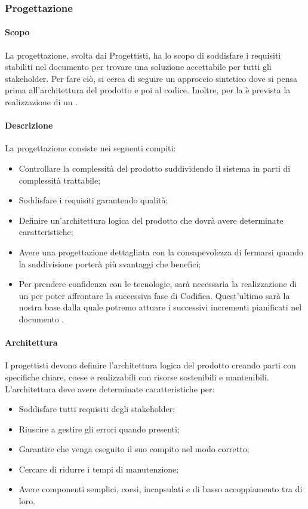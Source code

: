 \subsubsection{Progettazione}
\paragraph{Scopo}
La progettazione, svolta dai Progettisti, ha lo scopo di soddisfare i requisiti stabiliti nel documento \AdR{} per trovare una soluzione accettabile per tutti gli stakeholder.
Per fare ciò, si cerca di seguire un approccio sintetico dove si pensa prima all’architettura del prodotto e poi al codice. 
Inoltre, per la  è prevista la realizzazione di un .

\paragraph{Descrizione}
La progettazione consiste nei seguenti compiti:
\begin{itemize}
	\item Controllare la complessità del prodotto suddividendo il sistema in parti di complessità trattabile;
	\item Soddisfare i requisiti garantendo qualità;
	\item Definire un’architettura logica del prodotto che dovrà avere determinate caratteristiche;
	\item Avere una progettazione dettagliata con la consapevolezza di fermarsi quando la suddivisione porterà più svantaggi che benefici;
	\item Per prendere confidenza con le tecnologie, sarà necessaria la realizzazione di un  per poter affrontare la successiva fase di Codifica. Quest'ultimo sarà la nostra base dalla quale potremo attuare i successivi incrementi pianificati nel documento \PdP{}.
\end{itemize}

\paragraph{Architettura}
I progettisti devono definire l’architettura logica del prodotto creando parti con specifiche chiare, coese e realizzabili con risorse sostenibili e mantenibili. L'architettura deve avere determinate caratteristiche per:
\begin{itemize}
	\item Soddisfare tutti requisiti degli stakeholder;
	\item Riuscire a gestire gli errori quando presenti;
	\item Garantire che venga eseguito il suo compito nel modo corretto;
	\item Cercare di ridurre i tempi di manutenzione;
	\item Avere componenti semplici, coesi, incapsulati e di basso accoppiamento tra di loro.
\end{itemize}

